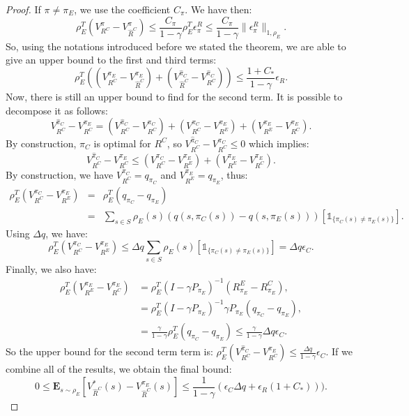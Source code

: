 \documentclass[smallextended]{svjour3}
\newcommand{\E}{\mathbf{E}}
\begin{document}
\begin{proof}
If $\pi\neq\pi_E$, we use the coefficient $C_\pi$. We have then:
\begin{equation}
  \rho_E^T(V^{\pi}_{R^C}-V^{\pi}_{\hat{R}^C})\leq\frac{C_\pi}{1-\gamma}\rho_E^T\epsilon^R_{\pi}\leq\frac{C_\pi}{1-\gamma}\|\epsilon^R_{\pi}\|_{1,\rho_E}.
  \end{equation}
So, using the notations introduced before we stated the theorem, we are able to give an upper bound to the first and third terms:
\begin{equation}
\rho_E^T((V^{\pi_E}_{R^C}-V^{\pi_E}_{\hat{R}^C})+(V^{\hat{\pi}_C}_{\hat{R}^C}-V^{\hat{\pi}_C}_{R^C}))\leq\frac{1+C_*}{1-\gamma}\epsilon_R.
\end{equation}
Now, there is still an upper bound to find for the second term. It is possible to decompose it as follows:
\begin{equation}
V^{\hat{\pi}_C}_{R^C}-V^{\pi_E}_{R^C}=(V^{\hat{\pi}_C}_{R^C}-V^{\pi_C}_{R^C})+(V^{\pi_C}_{R^C}-V^{\pi_E}_{R^E})+(V^{\pi_E}_{R^E}-V^{\pi_E}_{R^C}).
\end{equation}
By construction, $\pi_C$ is optimal for $R^C$, so $V^{\hat{\pi}_C}_{R^C}-V^{\pi_C}_{R^C}\leq0$ which implies:
\begin{equation}
V^{\hat{\pi}_C}_{R^C}-V^{\pi_E}_{R^C}\leq(V^{\pi_C}_{R^C}-V^{\pi_E}_{R^E})+(V^{\pi_E}_{R^E}-V^{\pi_E}_{R^C}).
\end{equation}
By construction, we have $V^{\pi_C}_{R^C}=q_{\pi_C}$ and $V^{\pi_E}_{R^E}=q_{\pi_E}$, thus:
\begin{eqnarray}
\rho_E^T(V^{\pi_C}_{R^C}-V^{\pi_E}_{R^E})&=&\rho_E^T(q_{\pi_C}-q_{\pi_E})\\
&=&\sum_{s\in S}\rho_E(s)(q(s,\pi_C(s))-q(s,\pi_E(s)))[\mathds{1}_{\{\pi_C(s)\neq\pi_E(s)\}}].
\end{eqnarray}
Using $\Delta q$, we have:
\begin{equation}
\rho_E^T(V^{\pi_C}_{R^C}-V^{\pi_E}_{R^E})\leq\Delta q\sum_{s\in S}\rho_E(s)[\mathds{1}_{\{\pi_C(s)\neq\pi_E(s)\}}]= \Delta q \epsilon_C.
\end{equation}
Finally, we also have:
\begin{align}
\rho_E^T(V^{\pi_E}_{R^E}-V^{\pi_E}_{R^C})&=\rho_E^T(I-\gamma P_{\pi_E})^{-1}(R^E_{\pi_E}-R^C_{\pi_E}),
\\
&=\rho_E^T(I-\gamma P_{\pi_E})^{-1}\gamma P_{\pi_E}(q_{\pi_C}-q_{\pi_E}),
\\
&=\frac{\gamma}{1-\gamma}\rho_E^T(q_{\pi_C}-q_{\pi_E})\leq \frac{\gamma}{1-\gamma}\Delta q \epsilon_C.
\end{align}
So the upper bound for the second term term is: $\rho_E^T(V^{\hat{\pi}_C}_{R^C}-V^{\pi_E}_{R^C})\leq \frac{\Delta q}{1-\gamma}\epsilon_C$.
If we combine all of the results, we obtain the final bound:
\begin{equation}
0\leq\E_{s\sim\rho_E}[V^*_{\hat{R}^C}(s)-V^{\pi_E}_{\hat{R}^C}(s)]\leq \frac{1}{1-\gamma}(\epsilon_C\Delta q +\epsilon_R(1+C_*))).
\end{equation}
\end{proof}
\end{document}
